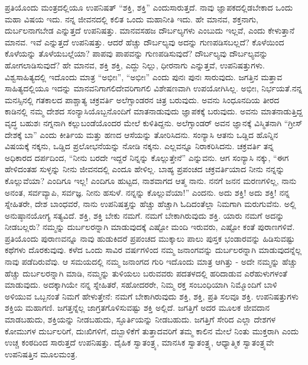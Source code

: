 ಪ್ರತಿಯೊಂದು ಮಂತ್ರದಲ್ಲಿಯೂ ಉಪನಿಷತ್​ “ಶಕ್ತಿ, ಶಕ್ತಿ” ಎಂದು\break ಸಾರುತ್ತದೆ. ನಾವು ಜ್ಞಾಪಕದಲ್ಲಿಡಬೇಕಾದ ಒಂದು ಮಹಾ ವಿಷಯ ಇದು. ನನ್ನ ಜೀವನದಲ್ಲಿ ಕಲಿತ ಒಂದು ಮಹಾನೀತಿ ಇದು. ಹೇ ಮಾನವ, ಶಕ್ತನಾಗು, ದುರ್ಬಲನಾಗಬೇಡ ಎನ್ನುತ್ತದೆ ಉಪನಿಷತ್ತು. ಮಾನವಸಹಜ ದೌರ್ಬಲ್ಯಗಳು ಎಂಬುದು ಇಲ್ಲವೆ, ಎಂದು ಕೇಳುತ್ತಾನೆ ಮಾನವ. ಇವೆ ಎನ್ನುತ್ತದೆ ಉಪನಿಷತ್ತು. ಆದರೆ ಹೆಚ್ಚು ದೌರ್ಬಲ್ಯವು ಅದನ್ನು ಗುಣಪಡಿಸಬಲ್ಲದೆ? ಕೊಳೆಯಿಂದ ಕೊಳೆಯನ್ನು ತೊಳೆಯಬಲ್ಲೆಯಾ? ಪಾಪವು ಪಾಪವನ್ನು ಗುಣಪಡಿಸುವುದೆ? ದೌರ್ಬಲ್ಯವು ದೌರ್ಬಲ್ಯವನ್ನು ಹೋಗಲಾಡಿಸುವುದೆ? ಹೇ ಮಾನವ, ಶಕ್ತಿ ಶಕ್ತಿ, ಎದ್ದು ನಿಲ್ಲು, ಧೀರನಾಗು ಎನ್ನುತ್ತವೆ, ಉಪನಿಷತ್ತುಗಳು. ವಿಶ್ವಸಾಹಿತ್ಯದಲ್ಲಿ ಇದೊಂದು ಮಾತ್ರ “ಅಭೀಃ”, “ಅಭೀಃ” ಎಂದು ಪುನಃ ಪುನಃ ಸಾರುವುದು. ಜಗತ್ತಿನ ಮತ್ತಾವ ಸಾಹಿತ್ಯದಲ್ಲಿಯೂ ಇದನ್ನು ಮಾನವನಿಗಾಗಲಿ\break ದೇವರಿಗಾಗಲಿ ವಿಶೇಷಣವಾಗಿ ಉಪಯೋಗಿಸಿಲ್ಲ. ಅಭೀಃ, ನಿರ್ಭಯತೆ.\break ನನ್ನ ಮನಸ್ಸಿನಲ್ಲಿ ಗತಕಾಲದ ಪಾಶ್ಚಾತ್ಯ ಚಕ್ರವರ್ತಿ ಅಲೆಗ್ಸಾಂಡರನ ಚಿತ್ರ ಬರುವುದು. ಅವನು ಸಿಂಧೂನದಿಯ ತೀರದ ಕಾಡಿನಲ್ಲಿ ನಮ್ಮ ದೇಶದ ಸಂನ್ಯಾಸಿಯೊಬ್ಬನೊಂದಿಗೆ ಮಾತನಾಡುವುದು ಜ್ಞಾಪಕಕ್ಕೆ ಬರುವುದು. ಅವನು ಮಾತನಾಡುತ್ತಿದ್ದ ವೃದ್ಧ ಬಹುಶಃ ನಗ್ನನಾಗಿ ಕಲ್ಲುಬಂಡೆಯೊಂದರ ಮೇಲೆ ಕುಳಿತಿದ್ದನು. ಅಲೆಗ್ಸಾಂಡರ್​ ಅವನ ಜ್ಞಾನಕ್ಕೆ ವಿಸ್ಮಿತನಾಗಿ “ಗ್ರೀಸ್​ ದೇಶಕ್ಕೆ ಬಾ” ಎಂದು ಕೀರ್ತಿಯ ಮತ್ತು ಹಣದ ಆಸೆಯನ್ನು ತೋರಿಸಿದನು. ಸಂನ್ಯಾಸಿ ಆತನು ಒಡ್ಡಿದ ಹೊನ್ನಿನ ವಿಷಯಕ್ಕೆ ನಕ್ಕನು, ಒಡ್ಡಿದ ಪ್ರಲೋಭನೆಯನ್ನು ನೋಡಿ ನಕ್ಕನು. ಎಲ್ಲವನ್ನೂ ನಿರಾಕರಿಸಿದನು. ಚಕ್ರವರ್ತಿ ತನ್ನ ಅಧಿಕಾರದ ದರ್ಪದಿಂದ, “ನೀನು ಬರದೇ ಇದ್ದರೆ ನಿನ್ನನ್ನು ಕೊಲ್ಲುತ್ತೇನೆ” ಎನ್ನುವನು. ಆಗ ಸಂನ್ಯಾಸಿ ನಕ್ಕು, “ಈಗ ಹೇಳಿದಂತಹ ಸುಳ್ಳನ್ನು ನೀನು ಜೀವನದಲ್ಲಿ ಎಂದೂ ಹೇಳಿಲ್ಲ. ಬಾಹ್ಯ ಪ್ರಪಂಚದ ಚಕ್ರವರ್ತಿಯಾದ ನೀನು ನನ್ನನ್ನು ಕೊಲ್ಲುವೆಯಾ? ಎಂದಿಗೂ ಇಲ್ಲ! ಎಂದಿಗೂ ಹುಟ್ಟದ, ನಾಶವಾಗದ ಆತ್ಮ ನಾನು. ನನಗೆ ಜನನ ಮರಣಗಳಿಲ್ಲ, ನಾನು ಅನಂತ, ಸರ್ವವ್ಯಾಪಿ, ಸರ್ವಜ್ಞ. ನೀನು ಹಸುಳೆ. ನನ್ನನ್ನು ಕೊಲ್ಲುವೆಯಾ!” ಎಂದನು. ಅದು ಶಕ್ತಿ! ಅದು ಶಕ್ತಿ! ನನ್ನ ಸ್ನೇಹಿತರೇ, ದೇಶ ಬಾಂಧವರೆ, ನಾನು ಉಪನಿಷತ್ತನ್ನು ಹೆಚ್ಚು ಹೆಚ್ಚಾಗಿ ಓದಿದಂತೆಲ್ಲಾ ನಿಮಗಾಗಿ ಮರುಗುವೆನು. ಅಲ್ಲಿ ಅನುಷ್ಠಾನಯೋಗ್ಯ ಸತ್ಯವಿದೆ. ಶಕ್ತಿ, ಶಕ್ತಿ ಬೇಕು ನಮಗೆ. ನಮಗೆ ಬೇಕಾಗಿರುವುದು ಶಕ್ತಿ. ಯಾರು ನಮಗೆ ಅದನ್ನು ನೀಡಬಲ್ಲರು? ನಮ್ಮನ್ನು ದುರ್ಬಲರನ್ನಾಗಿ ಮಾಡುವುದಕ್ಕೆ ಎಷ್ಟೋ ಮಂದಿ ಇರುವರು, ಎಷ್ಟೋ ಕಂತೆ ಪುರಾಣಗಳಿವೆ. ಪ್ರತಿಯೊಂದು ಪುರಾಣವನ್ನೂ ನಾವು ಹುಡುಕಿದರೆ ಪ್ರಪಂಚದ ಮುಕ್ಕಾಲು ಪಾಲು ಪುಸ್ತಕ ಭಂಡಾರವನ್ನು ಹಿಡಿಸುವಷ್ಟು ಕಥೆಗಳು ದೊರಕುವುವು. ಕಳೆದ ಒಂದು ಸಾವಿರ ವರ್ಷಗಳಿಂದ ನಮ್ಮ ಜನಾಂಗವನ್ನು ದುರ್ಬಲರನ್ನಾಗಿ ಮಾಡುವುದನ್ನೆಲ್ಲ ನಾವು ಪಡೆದಿರುವೆವು. ಆ ಸಮಯದಲ್ಲಿ ನಮ್ಮ ಜನಾಂಗದ ಗುರಿ ಇದೊಂದು ಮಾತ್ರ ಆಗಿತ್ತು - ಅದೇ ನಮ್ಮನ್ನು ಹೆಚ್ಚು ಹೆಚ್ಚು ದುರ್ಬಲರನ್ನಾಗಿ ಮಾಡಿ, ನಮ್ಮನ್ನು ತುಳಿಯಲು ಬರುವವರು ಪದತಳದಲ್ಲಿ ಹರಿದಾಡುವ ಎರೆಹುಳುಗಳಂತೆ ಮಾಡುವುದು. ಅದಕ್ಕಾಗಿಯೇ ನನ್ನ ಸ್ನೇಹಿತರೆ, ಸಹೋದರರೇ, ನಿಮ್ಮ ರಕ್ತ ಸಂಬಂಧಿಯಾಗಿ ನಿಮ್ಮೊಂದಿಗೆ ಬಾಳಿ ಅಳಿಯುವ ಒಬ್ಬನಂತೆ ನಿಮಗೆ ಹೇಳುತ್ತೇನೆ: ನಮಗೆ ಬೇಕಾಗಿರುವುದು ಶಕ್ತಿ, ಶಕ್ತಿ, ಪ್ರತಿ ಸಲವೂ ಶಕ್ತಿ. ಉಪನಿಷತ್ತುಗಳು ಶಕ್ತಿಯ ಮಹಾಗಣಿ. ಜಗತ್ತನ್ನೆಲ್ಲ ಜಾಗ್ರತಗೊಳಿಸುವಷ್ಟು ಶಕ್ತಿ ಅಲ್ಲಿದೆ. ಜಗತ್ತಿಗೆ ಅದರ ಮೂಲಕ ಜೀವದಾನ ಮಾಡಬಹುದು, ಶಕ್ತಿಯನ್ನು ನೀಡಬಹುದು, ಸ್ಫೂರ್ತಿಯನ್ನು ನೀಡಬಹುದು. ಜಗತ್ತಿಗೆ ಸೇರಿದ ಎಲ್ಲಾ ದೇಶಗಳ ಕೋಮುಗಳ ದುರ್ಬಲರಿಗೆ, ದುಃಖಿಗಳಿಗೆ, ದಬ್ಬಾಳಿಕೆಗೆ ತುತ್ತಾದವರಿಗೆ ತಮ್ಮ ಕಾಲಿನ ಮೇಲೆ ನಿಂತು ಮುಕ್ತರಾಗಿ ಎಂದು ಉಚ್ಚ ಕಂಠದಿಂದ ಸಾರುತ್ತದೆ ಉಪನಿಷತ್ತು. ದೈಹಿಕ ಸ್ವಾತಂತ್ರ್ಯ, ಮಾನಸಿಕ ಸ್ವಾತಂತ್ರ್ಯ, ಆಧ್ಯಾತ್ಮಿಕ ಸ್ವಾತಂತ್ರ್ಯವೇ ಉಪನಿಷತ್ತಿನ ಮೂಲಮಂತ್ರ.

